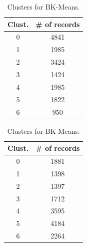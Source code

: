 \begin{table}
    \centering
    \small
    \begin{minipage}{0.45\linewidth}
        \centering
        \setlength{\tabcolsep}{4pt}  %
        \renewcommand{\arraystretch}{0.9}
        \begin{tabular}{cc}
            \toprule
            \textbf{Clust.} & \textbf{\# of records} \\ \midrule
            0 & 4841 \\
            1 & 1985 \\
            2 & 3424 \\
            3 & 1424 \\
            4 & 1985 \\
            5 & 1822 \\
            6 & 950 \\
            \bottomrule
        \end{tabular}
        \caption{Clusters for K-Means.}
        \label{tab:clusters_kmeans}
    \end{minipage}
    \hfill
    \begin{minipage}{0.45\linewidth}
        \centering
        \small
        \setlength{\tabcolsep}{4pt}  %
        \renewcommand{\arraystretch}{0.9}
        \begin{tabular}{cc}
           \toprule
            \textbf{Clust.} & \textbf{\# of records} \\
            \midrule
            0 & 1881 \\
            1 & 1398 \\
            2 & 1397 \\
            3 & 1712 \\
            4 & 3595 \\
            5 & 4184 \\
            6 & 2264 \\
            \bottomrule
        \end{tabular}
        \caption{Clusters for BK-Means.}
        \label{tab:clusters_bkmeans}
    \end{minipage}
\end{table}

